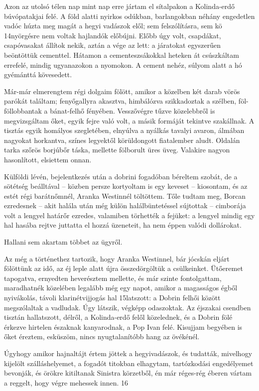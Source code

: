 \documentclass{IEEEtran}
\begin{document}
Azon az utolsó télen nap mint nap erre jártam el sítalpakon a Kolinda-erdő
búvópatakjai felé. A föld alatti nyirkos odúkban, barlangokban néhány
engedetlen vadóc húzta meg magát a hegyi vadászok elől; sem felszólításra, sem
kö 14nyörgésre nem voltak hajlandók előbújni. Előbb úgy volt, csapdákat,
csapóvasakat állítok nekik, aztán a vége az lett: a járatokat egyszerűen
beöntöttük cementtel. Hátamon a cementeszsákokkal heteken át csúszkáltam
errefelé, mindig ugyanazokon a nyomokon. A cement nehéz, súlyom alatt a hó
gyémánttá kövesedett.

Már-már elmerengtem régi dolgaim fölött, amikor a közelben két darab vörös
parókát találtam; fenyőgallyra akasztva, himbálózva szikkadoztak a szélben,
föl-föllobbantak a bánat-felhő fényében. Vesszővégre tűzve közelebbről is
megvizsgáltam őket, egyik fejre való volt, a másik formáját tekintve
szakállnak. A tisztás egyik homályos szegletében, elnyúlva a nyálkás tavalyi
avaron, álmában nagyokat horkantva, színes legyektől körüldongott fiatalember
aludt. Oldalán tarka szőrös borjúbőr táska, mellette fölborult üres üveg.
Valakire nagyon hasonlított, elsiettem onnan.

Külföldi lévén, bejelentkezés után a dobrini fogadóban béreltem szobát, de a
sötétség beálltával – közben persze kortyoltam is egy keveset – kiosontam, és
az estét régi barátnőmnél, Aranka Westinnél töltöttem. Tőle tudtam meg, Borcan
ezredesnek – akit halála után még külön halálbüntetéssel sújtottak – cimborája
volt a lengyel határőr ezredes, valamiben törhették a fejüket: a lengyel
mindig egy hal hasába rejtve juttatta el hozzá üzeneteit, ha nem éppen valódi
dollárokat.

Hallani sem akartam többet az ügyről.

Az még a történethez tartozik, hogy Aranka Westinnel, bár jócskán eljárt
fölöttünk az idő, az éj leple alatt újra összedörgöltük a csülkeinket.
Ütőeremet tapogatva, ernyedten heverésztem mellette, és már szinte
fontolgattam, maradhatnék közelében legalább még egy napot, amikor a
magasságos égből nyivákolás, távoli klarinétvijjogás hal 15latszott: a Dobrin
felhői között megszólaltak a vadludak. Úgy látszik, végképp odaszoktak. Az
éjszakai csendben tisztán hallatszott, délről, a Kolinda-erdő felől
közelednek, és a Dobrin fölé érkezve hirtelen északnak kanyarodnak, a Pop Ivan
felé. Kisujjam begyében is őket éreztem, esküszöm, nincs nyugtalanítóbb hang
az övékénél.

Úgyhogy amikor hajnaltájt értem jöttek a hegyivadászok, és tudatták, mivelhogy
kijelölt szálláshelyemet, a fogadót titokban elhagytam, tartózkodási
engedélyemet bevonják, és örökre kitiltanak Sinistra körzetből, én már
réges-rég éberen vártam a reggelt, hogy végre mehessek innen.
16
\end{document}
